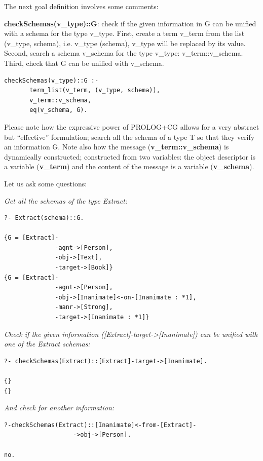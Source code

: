 \documentclass{book}
\begin{document}
The next goal definition involves some comments: 

{\bf checkSchemas(v\_type)::G}: check if the given information in G
can be unified with a schema for the type v\_type. First, create a
term v\_term from the list (v\_type, schema), i.e. v\_type (schema),
v\_type will be replaced by its value. Second, search a schema
v\_schema for the type v\_type: v\_term::v\_schema. Third, check that
G can be unified with v\_schema.


\begin{verbatim}
checkSchemas(v_type)::G :-
       term_list(v_term, (v_type, schema)), 
       v_term::v_schema,
       eq(v_schema, G).
\end{verbatim}


Please note how the expressive power of PROLOG+CG allows for a very
abstract but ``effective'' formulation; search all the schema of a type
T so that they verify an information G. Note also how the message
({\bf v\_term::v\_schema}) is dynamically constructed;
constructed from two variables: the object descriptor is a variable
({\bf v\_term}) and the content of the message is a variable
({\bf v\_schema}).

Let us ask some questions:

{\it Get all the schemas of the type Extract:}

\begin{verbatim}
?- Extract(schema)::G.

{G = [Extract]-
              -agnt->[Person],
              -obj->[Text],
              -target->[Book]}
{G = [Extract]-
              -agnt->[Person],
              -obj->[Inanimate]<-on-[Inanimate : *1],
              -manr->[Strong],
              -target->[Inanimate : *1]}
\end{verbatim}


{\it Check if the given information ([Extract]-target->[Inanimate])
can be unified with one of the Extract schemas:}


\begin{verbatim}
?- checkSchemas(Extract)::[Extract]-target->[Inanimate].

{}
{}
\end{verbatim}



{\it And check for another information:}

\begin{verbatim}
?-checkSchemas(Extract)::[Inanimate]<-from-[Extract]-
                   ->obj->[Person].

no.
\end{verbatim}
\end{document}
